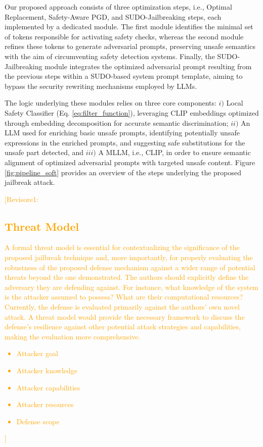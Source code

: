 \documentclass[acmsmall]{acmart}
\newcommand{\revone}[1]{\textcolor{orange}{[Revisore1: #1]}}
\begin{document}
Our proposed approach consists of three optimization steps, i.e., Optimal Replacement, Safety-Aware PGD, and SUDO-Jailbreaking steps, each implemented by a dedicated module.
The first module identifies the minimal set of tokens responsible for activating safety checks, whereas the second module refines these tokens to generate adversarial prompts, preserving unsafe semantics with the aim of circumventing safety detection systems. Finally, the SUDO-Jailbreaking module integrates the optimized adversarial prompt resulting from the previous steps within a SUDO-based system prompt template, aiming to bypass the security rewriting mechanisms employed by LLMs.
{
The logic underlying these modules relies on three core components: $i)$ Local Safety Classifier (Eq. \ref{eq:filter_function}), leveraging CLIP embeddings optimized through embedding decomposition for accurate semantic discrimination; $ii)$ An LLM used for enriching basic unsafe prompts, identifying potentially unsafe expressions in the enriched prompts, and suggesting safe substitutions for the unsafe part detected, and $iii)$ A MLLM, i.e., CLIP, in order to ensure semantic alignment of optimized adversarial prompts with targeted unsafe content. Figure \ref{fig:pipeline_soft} provides an overview of the steps underlying the proposed jailbreak attack. 

\revone{\subsection{Threat Model}
A formal threat model is essential for contextualizing the significance of the proposed jailbreak technique and, more importantly, for properly evaluating the robustness of the proposed defense mechanism against a wider range of potential threats beyond the one demonstrated. The authors should explicitly define the adversary they are defending against. For instance, what knowledge of the system is the attacker assumed to possess? What are their computational resources? Currently, the defense is evaluated primarily against the authors' own novel attack. A threat model would provide the necessary framework to discuss the defense's resilience against other potential attack strategies and capabilities, making the evaluation more comprehensive.
\begin{itemize}
    \item Attacker goal
    \item Attacker knowledge
    \item Attacker capabilities
    \item Attacker resources
    \item Defense scope
\end{itemize}}



}
\end{document}
